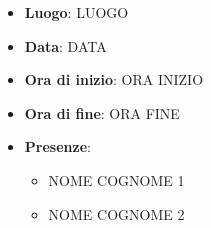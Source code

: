 \begin{itemize}
    \item \textbf{Luogo}: LUOGO
    \item \textbf{Data}: DATA
    \item \textbf{Ora di inizio}: ORA INIZIO
    \item \textbf{Ora di fine}: ORA FINE
    \item \textbf{Presenze}:
          \begin{itemize}
              \item NOME COGNOME 1
              \item NOME COGNOME 2
          \end{itemize}
\end{itemize}